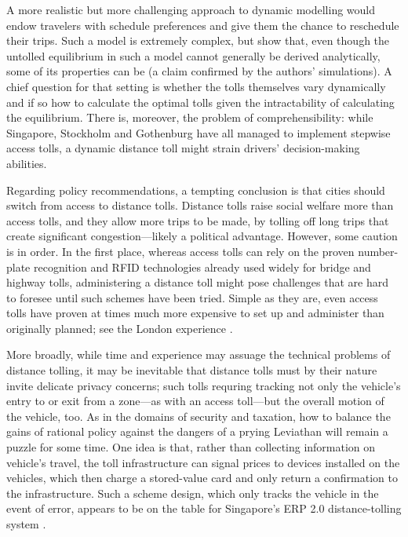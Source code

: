 \documentclass[preprint,authoryear]{elsarticle}
\begin{document}
A more realistic but more challenging approach to dynamic modelling would endow travelers with schedule preferences and give them the chance to reschedule their trips. Such a model is extremely complex, but \citet{Lamotte2017} show that, even though the untolled equilibrium in such a model cannot generally be derived analytically, some of its properties can be (a claim confirmed by the authors' simulations). A chief question for that setting is whether the tolls themselves vary dynamically and if so how to calculate the optimal tolls given the intractability of calculating the equilibrium. There is, moreover, the problem of comprehensibility: while Singapore, Stockholm and Gothenburg have all managed to implement stepwise access tolls, a dynamic distance toll might strain drivers' decision-making abilities.

Regarding policy recommendations, a tempting conclusion is that cities should switch from access to distance tolls. Distance tolls raise social welfare more than access tolls, and they allow more trips to be made, by tolling off long trips that create significant congestion---likely a political advantage. However, some caution is in order. In the first place, whereas access tolls can rely on the proven number-plate recognition and RFID technologies already used widely for bridge and highway tolls, administering a distance toll might pose challenges that are hard to foresee until such schemes have been tried. Simple as they are, even access tolls have proven at times much more expensive to set up and administer than originally planned; see the London experience \citep{santos2008}. 

More broadly, while time and experience may assuage the technical problems of distance tolling, it may be inevitable that distance tolls must by their nature invite delicate privacy concerns; such tolls requring tracking not only the vehicle's entry to or exit from a zone---as with an access toll---but the overall motion of the vehicle, too. As in the domains of security and taxation, how to balance the gains of rational policy against the dangers of a prying Leviathan will remain a puzzle for some time. One idea is that, rather than collecting information on vehicle's travel, the toll infrastructure can signal prices to devices installed on the vehicles, which then charge a stored-value card and only return a confirmation to the infrastructure. Such a scheme design, which only tracks the vehicle in the event of error, appears to be on the table for Singapore's ERP 2.0 distance-tolling system \citep{Tan2016}.
\end{document}
